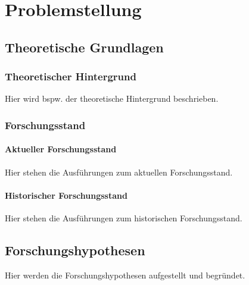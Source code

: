 \chapter{Problemstellung}
\section{Theoretische Grundlagen}
\subsection{Theoretischer Hintergrund}
Hier wird bspw. der theoretische Hintergrund beschrieben.

\subsection{Forschungsstand}
\subsubsection{Aktueller Forschungsstand}
Hier stehen die Ausführungen zum aktuellen Forschungsstand.

\subsubsection{Historischer Forschungsstand}
Hier stehen die Ausführungen zum historischen Forschungsstand.

\section{Forschungshypothesen}
Hier werden die Forschungshypothesen aufgestellt und begründet.